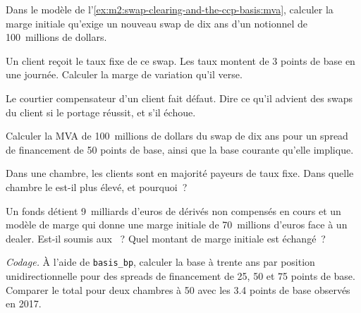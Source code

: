 \begin{exercise}[$\star$]\label{exo:m2:swap-clearing-and-the-ccp-basis:1}
Dans le modèle de l'\cref{ex:m2:swap-clearing-and-the-ccp-basis:mva}, calculer la marge initiale
qu'exige un nouveau swap de dix ans d'un notionnel de 100~millions de dollars.
\end{exercise}

\begin{exercise}[$\star$]\label{exo:m2:swap-clearing-and-the-ccp-basis:2}
Un client reçoit le taux fixe de ce swap. Les taux montent de 3 points de base en une journée. Calculer
la marge de variation qu'il verse.
\end{exercise}

\begin{exercise}[$\star$]\label{exo:m2:swap-clearing-and-the-ccp-basis:3}
Le courtier compensateur d'un client fait défaut. Dire ce qu'il advient des swaps du client si le
portage réussit, et s'il échoue.
\end{exercise}

\begin{exercise}[$\star\star$]\label{exo:m2:swap-clearing-and-the-ccp-basis:4}
Calculer la MVA de 100~millions de dollars du swap de dix ans pour un spread de financement
de 50 points de base, ainsi que la base courante qu'elle implique.
\end{exercise}

\begin{exercise}[$\star\star$]\label{exo:m2:swap-clearing-and-the-ccp-basis:5}
Dans une chambre, les clients sont en majorité payeurs de taux fixe. Dans quelle chambre le  est-il plus élevé, et pourquoi~?
\end{exercise}

\begin{exercise}[$\star\star$]\label{exo:m2:swap-clearing-and-the-ccp-basis:6}
Un fonds détient 9~milliards d'euros de dérivés non compensés en cours et un modèle de marge qui
donne une marge initiale de 70~millions d'euros face à un dealer. Est-il soumis aux ~? Quel montant de marge initiale est échangé~?
\end{exercise}

\begin{exercise}[$\star\star\star$]\label{exo:m2:swap-clearing-and-the-ccp-basis:7}
\emph{Codage.} À l'aide de \texttt{basis\_bp}, calculer la base à trente ans par position
unidirectionnelle pour des spreads de financement de 25, 50 et 75 points de base. Comparer le total
pour deux chambres à 50 avec les 3.4 points de base observés en 2017.
\end{exercise}

